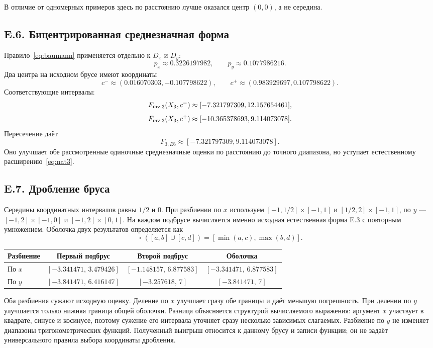\documentclass[12pt,a4paper]{article}
\newcommand{\hull}{\mathop{\square}}
\begin{document}
В отличие от одномерных примеров здесь по расстоянию лучше
оказался центр $(0,0)$, а не середина.

\subsection*{E.6. Бицентрированная среднезначная форма}
Правило~\eqref{eq:baumann} применяется отдельно к $D_x$ и $D_y$:
\[
p_x\approx0.3226197982,\qquad p_y\approx0.1077986216.
\]
Два центра на исходном брусе имеют координаты
\[
c^-\approx(0.016070303,-0.107798622),\qquad
c^+\approx(0.983929697,0.107798622).
\]
Соответствующие интервалы:
\[
F_{{\rm mv},3}(X_3,c^-)\approx[-7.321797309,12.157654461],
\]
\[
F_{{\rm mv},3}(X_3,c^+)\approx[-10.365378693,9.114073078].
\]
Пересечение даёт
\[
F_{3,E6}\approx[-7.321797309,9.114073078].
\]
Оно улучшает обе рассмотренные одиночные среднезначные оценки
по расстоянию до точного диапазона, но уступает естественному
расширению~\eqref{eq:nat3}.

\subsection*{E.7. Дробление бруса}
Середины координатных интервалов равны $1/2$ и $0$.
При разбиении по $x$ используем $[-1,1/2]\times[-1,1]$ и
$[1/2,2]\times[-1,1]$, по $y$ --- $[-1,2]\times[-1,0]$ и
$[-1,2]\times[0,1]$. На каждом подбрусе вычисляется именно
исходная естественная форма E.3 с повторным умножением.
Оболочка двух результатов определяется как
\[
\hull([a,b]\cup[c,d])=[\min(a,c),\max(b,d)].
\]

\begin{center}
{\small
\begin{tabular}{lccc}
\toprule
Разбиение & Первый подбрус & Второй подбрус & Оболочка\\\midrule
По $x$ & $[-3.341471,\,3.479426]$ & $[-1.148157,\,6.877583]$ & $[-3.341471,\,6.877583]$\\
По $y$ & $[-3.841471,\,6.416147]$ & $[-3.257618,\,7]$ & $[-3.841471,\,7]$\\
\bottomrule
\end{tabular}}
\end{center}

Оба разбиения сужают исходную оценку. Деление по $x$ улучшает
сразу обе границы и даёт меньшую погрешность. При делении по $y$
улучшается только нижняя граница общей оболочки.
Разница объясняется структурой вычисляемого выражения: аргумент $x$
участвует в квадрате, синусе и косинусе, поэтому сужение его
интервала уточняет сразу несколько зависимых слагаемых.
Разбиение по $y$ не изменяет диапазоны тригонометрических функций.
Полученный выигрыш относится к данному брусу и записи функции;
он не задаёт универсального правила выбора координаты дробления.
\end{document}
